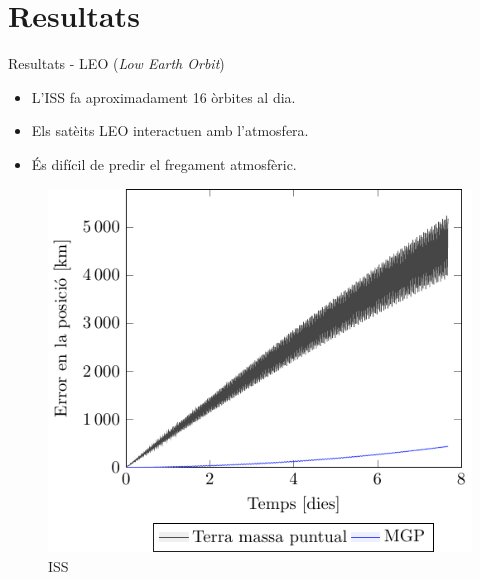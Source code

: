 \documentclass{beamer} %
\begin{document}
\section{Resultats}
\begin{frame}{Resultats - LEO (\emph{Low Earth Orbit})}
  \begin{itemize}
    \item L'ISS fa aproximadament 16 òrbites al dia.
    \item Els satè\lgem its LEO interactuen amb l'atmosfera.
    \item És difícil de predir el fregament atmosfèric.
  \end{itemize}
  \begin{figure}[htbp]
    \centering
    \begin{minipage}[ht]{0.45\textwidth}
      \centering
      \includegraphics[width=\textwidth]{../Images/simulation/ISS_pointMass_comparison_ca.pdf}
      \caption{\hspace{0.8cm}ISS}
    \end{minipage}
    \hspace{0.0333333\textwidth}
    \begin{minipage}[ht]{0.45\textwidth}
      \centering

\end{minipage}
\end{figure}
\end{frame}
\end{document}

